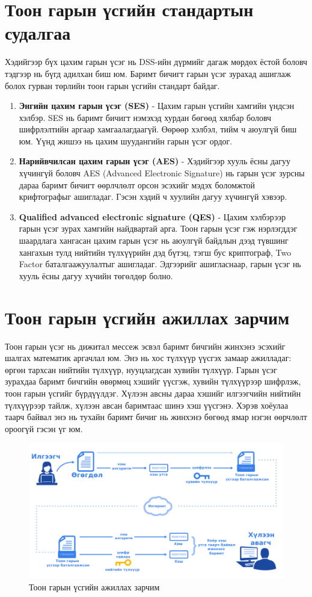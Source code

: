 \section[Тоон гарын үсэг]{Тоон гарын үсгийн стандартын судалгаа}
Хэдийгээр бүх цахим гарын үсэг нь DSS-ийн дүрмийг дагаж мөрдөх ёстой боловч тэдгээр нь бүгд адилхан биш юм. Баримт бичигт гарын үсэг зурахад ашиглаж болох гурван төрлийн тоон гарын үсгийн стандарт байдаг.
\begin{enumerate}
	\item \textbf{Энгийн цахим гарын үсэг (SES)} - Цахим гарын үсгийн хамгийн үндсэн хэлбэр. SES нь баримт бичигт нэмэхэд хурдан бөгөөд хялбар боловч шифрлэлтийн аргаар хамгаалагдаагүй. Өөрөөр хэлбэл, тийм ч аюулгүй биш юм. Үүнд жишээ нь цахим шуудангийн гарын үсэг ордог.
	\item \textbf{Нарийвчилсан цахим гарын үсэг (AES)} - Хэдийгээр хууль ёсны дагуу хүчингүй боловч AES (Advanced Electronic Signature) нь гарын үсэг зурсны дараа баримт бичигт өөрлчлөлт орсон эсэхийг мэдэх боломжтой крифтографыг ашигладаг. Гэсэн хэдий ч хуулийн дагуу хүчингүй хэвээр.
	\item \textbf{Qualified advanced electronic signature (QES)} - Цахим хэлбэрээр гарын үсэг зурах хамгийн найдвартай арга. Тоон гарын үсэг гэж нэрлэгддэг шаардлага хангасан цахим гарын үсэг нь аюулгүй байдлын дээд түвшинг хангахын тулд нийтийн түлхүүрийн дэд бүтэц, тэгш бус криптограф, Two Factor баталгаажуулалтыг ашигладаг. Эдгээрийг ашигласнаар, гарын үсэг нь хууль ёсны дагуу хүчийн төгөлдөр болно.
\end{enumerate}
\section[Ажиллах зарчим]{Тоон гарын үсгийн ажиллах зарчим}
Тоон гарын үсэг нь дижитал мессеж эсвэл баримт бичгийн жинхэнэ эсэхийг шалгах математик аргачлал юм. Энэ нь хос түлхүүр үүсгэх замаар ажилладаг: өргөн тархсан нийтийн түлхүүр, нууцлагдсан хувийн түлхүүр. Гарын үсэг зурахдаа баримт бичгийн өвөрмөц хэшийг үүсгэж, хувийн түлхүүрээр шифрлэж, тоон гарын үсгийг бүрдүүлдэг. Хүлээн авсны дараа хэшийг илгээгчийн нийтийн түлхүүрээр тайлж, хүлээн авсан баримтаас шинэ хэш үүсгэнэ. Хэрэв хоёулаа таарч байвал энэ нь тухайн баримт бичиг нь жинхэнэ бөгөөд ямар нэгэн өөрчлөлт ороогүй гэсэн үг юм.

\begin{figure}
	\centering
	\includegraphics[scale=0.5]{assets/digisigi.png}
	\caption{Тоон гарын үсгийн ажиллах зарчим}
	\label{fig:architecture}
\end{figure}

